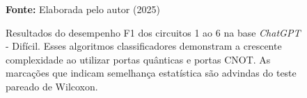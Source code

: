 \begin{figure}
\caption{Resultados do desempenho F1 dos circuitos 1 ao 6 na base \textit{ChatGPT} - Difícil. Esses algoritmos classificadores demonstram a crescente complexidade ao utilizar portas quânticas e portas CNOT. As marcações que indicam semelhança estatística são advindas do teste pareado de Wilcoxon.}
\label{fig:f1:hard:g1}
     \centering
    \centering

      \par\medskip\ABNTEXfontereduzida\selectfont\textbf{Fonte:} Elaborada pelo autor (2025) \par\medskip
\end{figure}